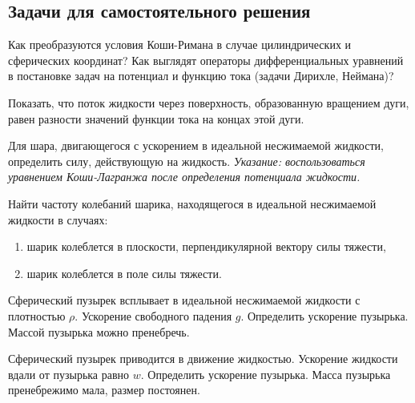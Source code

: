 \documentclass[a4paper, 14pt]{extarticle}
\begin{document}
%
%
%
%
%
%		
%
%
%


\subsection{Задачи для самостоятельного решения}

\begin{problems}
	
	\item 
	Как преобразуются условия Коши-Римана в случае цилиндрических и сферических координат? Как выглядят операторы дифференциальных уравнений в постановке задач на потенциал и функцию тока (задачи Дирихле, Неймана)?
	
	\item Показать, что поток жидкости через поверхность, образованную вращением дуги, равен разности значений функции тока на концах этой дуги.
	
	\item 
	Для шара, двигающегося с ускорением в идеальной несжимаемой жидкости, определить силу, действующую на жидкость. \textit{Указание: воспользоваться уравнением Коши-Лагранжа после определения потенциала жидкости.}
	
	\item 
	Найти частоту колебаний шарика, находящегося в идеальной несжимаемой жидкости в случаях: 
	\begin{enumerate}
		\item шарик колеблется в плоскости, перпендикулярной вектору силы тяжести,
		\item шарик колеблется в поле силы тяжести.
	\end{enumerate}
	
	\item 
	Сферический пузырек всплывает в идеальной несжимаемой жидкости с плотностью $\rho$. Ускорение свободного падения $g$. Определить ускорение пузырька. Массой пузырька можно пренебречь.
	
	\item
	Сферический пузырек приводится в движение жидкостью. Ускорение жидкости вдали от пузырька равно $w$. Определить ускорение пузырька. Масса пузырька пренебрежимо мала, размер постоянен.
	
\end{problems}	
\end{document}
